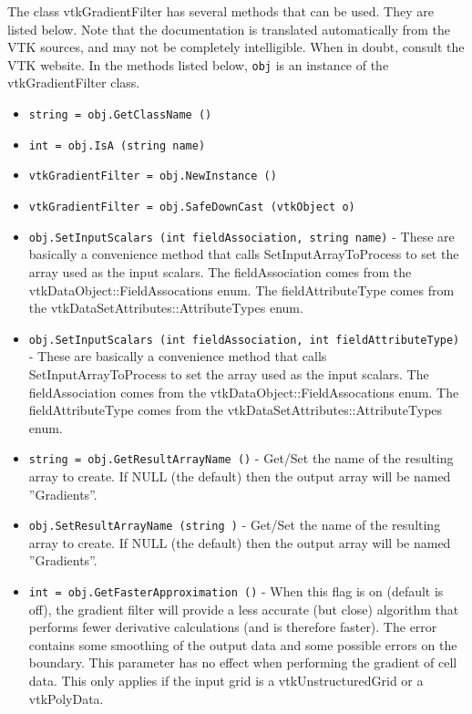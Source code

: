 The class vtkGradientFilter has several methods that can be used.
  They are listed below.
Note that the documentation is translated automatically from the VTK sources,
and may not be completely intelligible.  When in doubt, consult the VTK website.
In the methods listed below, \verb|obj| is an instance of the vtkGradientFilter class.
\begin{itemize}
\item  \verb|string = obj.GetClassName ()|

\item  \verb|int = obj.IsA (string name)|

\item  \verb|vtkGradientFilter = obj.NewInstance ()|

\item  \verb|vtkGradientFilter = obj.SafeDownCast (vtkObject o)|

\item  \verb|obj.SetInputScalars (int fieldAssociation, string name)| -  These are basically a convenience method that calls SetInputArrayToProcess
 to set the array used as the input scalars.  The fieldAssociation comes
 from the vtkDataObject::FieldAssocations enum.  The fieldAttributeType
 comes from the vtkDataSetAttributes::AttributeTypes enum.

\item  \verb|obj.SetInputScalars (int fieldAssociation, int fieldAttributeType)| -  These are basically a convenience method that calls SetInputArrayToProcess
 to set the array used as the input scalars.  The fieldAssociation comes
 from the vtkDataObject::FieldAssocations enum.  The fieldAttributeType
 comes from the vtkDataSetAttributes::AttributeTypes enum.

\item  \verb|string = obj.GetResultArrayName ()| -  Get/Set the name of the resulting array to create.  If NULL (the
 default) then the output array will be named ''Gradients''.

\item  \verb|obj.SetResultArrayName (string )| -  Get/Set the name of the resulting array to create.  If NULL (the
 default) then the output array will be named ''Gradients''.

\item  \verb|int = obj.GetFasterApproximation ()| -  When this flag is on (default is off), the gradient filter will provide a
 less accurate (but close) algorithm that performs fewer derivative
 calculations (and is therefore faster).  The error contains some smoothing
 of the output data and some possible errors on the boundary.  This
 parameter has no effect when performing the gradient of cell data.
 This only applies if the input grid is a vtkUnstructuredGrid or a
 vtkPolyData.


\end{itemize}

